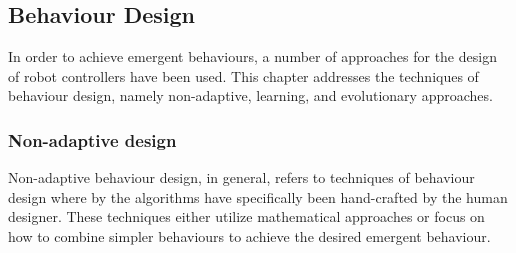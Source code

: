 \subsection{Behaviour Design}

In order to achieve emergent behaviours, a number of approaches for the design of robot controllers have been used. This chapter addresses the techniques of behaviour design, namely non-adaptive, learning, and evolutionary approaches.

\subsubsection{Non-adaptive design}
Non-adaptive behaviour design, in general, refers to techniques of behaviour design where by the algorithms have specifically been hand-crafted by the human designer. These techniques either utilize mathematical approaches or focus on how to combine simpler behaviours to achieve the desired emergent behaviour. 

